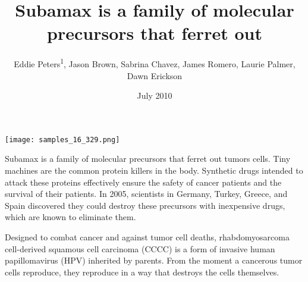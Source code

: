 \documentclass{article}
\title{Subamax is a family of molecular precursors that ferret out}
\author{Eddie Peters\textsuperscript{1},  Jason Brown,  Sabrina Chavez,  James Romero,  Laurie Palmer,  Dawn Erickson}
\affil{\textsuperscript{1}Medical School of Southeast University}
\date{July 2010}
\begin{document}
\maketitle

\begin{center}
\begin{minipage}{0.75\linewidth}
\texttt{[image: samples\_16\_329.png]}
\end{minipage}
\end{center}

Subamax is a family of molecular precursors that ferret out tumors cells. Tiny machines are the common protein killers in the body. Synthetic drugs intended to attack these proteins effectively ensure the safety of cancer patients and the survival of their patients. In 2005, scientists in Germany, Turkey, Greece, and Spain discovered they could destroy these precursors with inexpensive drugs, which are known to eliminate them.

Designed to combat cancer and against tumor cell deaths, rhabdomyosarcoma cell-derived squamous cell carcinoma (CCCC) is a form of invasive human papillomavirus (HPV) inherited by parents. From the moment a cancerous tumor cells reproduce, they reproduce in a way that destroys the cells themselves.
\end{document}
